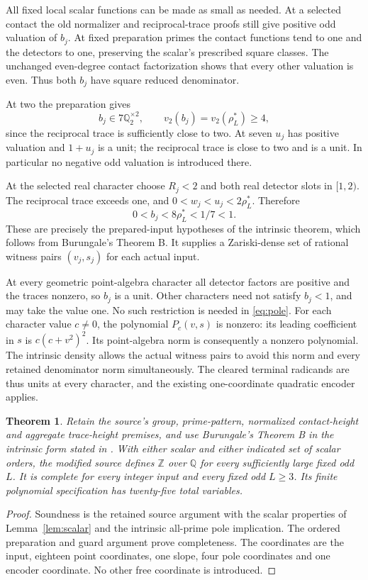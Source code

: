 \documentclass[11pt,a4paper]{article}
\newtheorem{theorem}{Theorem}[section]
\newcommand{\Q}{\mathbb Q}\newcommand{\Z}{\mathbb Z}
\begin{document}
All fixed local scalar functions can be made as small as needed.
At a selected contact the old normalizer and reciprocal-trace
proofs still give positive odd valuation of \(b_j\). At fixed
preparation primes the contact functions tend to one and the
detectors to one, preserving the scalar's prescribed square
classes. The unchanged even-degree contact factorization shows
that every other valuation is even. Thus both \(b_j\) have square
reduced denominator.

At two the preparation gives
\[
          b_j\in7\Q_2^{\times2},\qquad
          v_2(b_j)=v_2(\rho_L^*)\ge4,
\]
since the reciprocal trace is sufficiently close to two.
At seven \(u_j\) has positive valuation and \(1+u_j\) is a unit;
the reciprocal trace is close to two and is a unit. In particular
no negative odd valuation is introduced there.

At the selected real character choose \(R_j<2\) and both real
detector slots in \([1,2)\). The reciprocal trace exceeds one,
and \(0<w_j<u_j<2\rho_L^*\). Therefore
\[
                    0<b_j<8\rho_L^*<1/7<1.
\]
These are precisely the prepared-input hypotheses of the intrinsic
theorem, which follows from Burungale's Theorem B. It supplies a
Zariski-dense set of rational witness pairs \((v_j,s_j)\) for each
actual input.

At every geometric point-algebra character all detector factors
are positive and the traces nonzero, so \(b_j\) is a unit. Other
characters need not satisfy \(b_j<1\), and may take the value one.
No such restriction is needed in \eqref{eq:pole}.
For each character value \(c\ne0\), the polynomial \(P_c(v,s)\)
is nonzero: its leading coefficient in \(s\) is \(c(c+v^2)^2\).
Its point-algebra norm is consequently a nonzero polynomial.
The intrinsic density allows the actual witness pairs to avoid
this norm and every retained denominator norm simultaneously.
The cleared terminal radicands are thus units at every character,
and the existing one-coordinate quadratic encoder applies.

\begin{theorem}
Retain the source's group, prime-pattern, normalized contact-height
and aggregate trace-height premises, and use Burungale's Theorem B
in the intrinsic form stated in \cite{Intrinsic}.
With either scalar and either indicated set of scalar orders,
the modified source defines \(\Z\) over \(\Q\) for every sufficiently
large fixed odd \(L\). It is complete for every integer input and
every fixed odd \(L\ge3\). Its finite polynomial specification has
twenty-five total variables.
\end{theorem}
\begin{proof}
Soundness is the retained source argument with the scalar properties
of Lemma~\ref{lem:scalar} and the intrinsic all-prime pole implication.
The ordered preparation and guard argument prove completeness.
The coordinates are the input, eighteen point coordinates, one slope,
four pole coordinates and one encoder coordinate. No other free
coordinate is introduced.
\end{proof}
\end{document}
